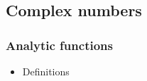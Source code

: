 \subsection{Complex numbers}



\subsubsection{Analytic functions}
\begin{itemize}
\item Definitions\\

\end{itemize}